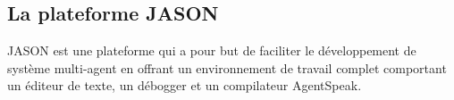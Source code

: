 \subsection{La plateforme JASON}
JASON est une plateforme qui a pour but de faciliter le développement de système multi-agent en offrant un environnement de travail complet comportant un éditeur de texte, un débogger et un compilateur AgentSpeak.